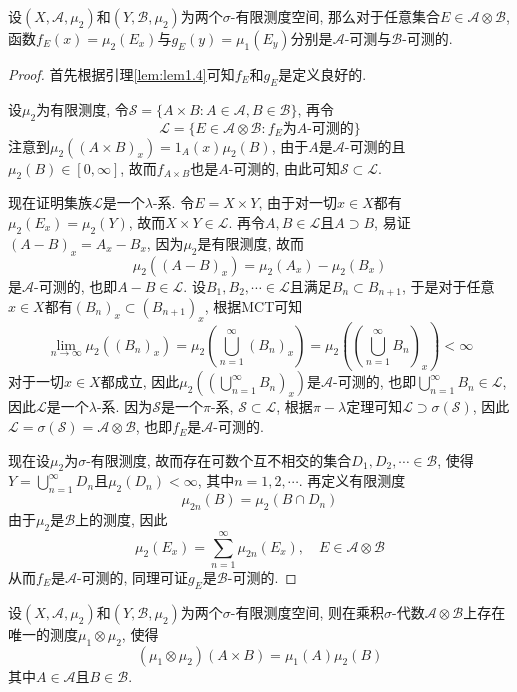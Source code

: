 \documentclass[cn, 12pt, math=mtpro2, bibstyle=apa, blue, twocol]{elegantbook}
\newcommand{\limn}{\lim_{n\to\infty}}
\newcommand{\SE}{\mathcal{S}}
\begin{document}
\begin{lemma}\label{lem:lem1.3}
设$(X,\mathcal{A},\mu_2)$和$(Y,\mathcal{B},\mu_2)$为两个$\sigma$-有限测度空间, 那么对于任意集合$E\in\mathcal{A}\otimes\mathcal{B}$, 函数$f_E(x)=\mu_2(E_x)$与$g_E(y)=\mu_1(E_y)$分别是$\mathcal{A}$-可测与$\mathcal{B}$-可测的.
\end{lemma}
\begin{proof}
  首先根据引理\ref{lem:lem1.4}可知$f_E$和$g_E$是定义良好的.

  设$\mu_2$为有限测度, 令$\SE=\{A\times B: A\in\mathcal{A}, B\in\mathcal{B}\}$, 再令
  $$\mathcal{L}=\{E\in\mathcal{A}\otimes\mathcal{B}: f_E\text{为}A\text{-可测的}\}$$
  注意到$\mu_2((A\times B)_x)=1_A(x)\mu_2(B)$, 由于$A$是$\mathcal{A}$-可测的且$\mu_2(B)\in[0,\infty]$, 故而$f_{A\times B}$也是$A$-可测的, 由此可知$\SE\subset\mathcal{L}$.

  现在证明集族$\mathcal{L}$是一个$\lambda$-系. 令$E=X\times Y$, 由于对一切$x\in X$都有$\mu_2(E_x)=\mu_2(Y)$, 故而$X\times Y\in\mathcal{L}$. 再令$A,B\in\mathcal{L}$且$A\supset B$, 易证$(A-B)_x=A_x-B_x$, 因为$\mu_2$是有限测度, 故而
  $$\mu_2((A-B)_x)=\mu_2(A_x)-\mu_2(B_x)$$
  是$\mathcal{A}$-可测的, 也即$A-B\in\mathcal{L}$. 设$B_1,B_2,\cdots\in\mathcal{L}$且满足$B_n\subset B_{n+1}$, 于是对于任意$x\in X$都有$(B_n)_x\subset (B_{n+1})_x$, 根据MCT可知
  $$\limn\mu_2((B_n)_x)=\mu_2\left(\bigcup_{n=1}^\infty (B_n)_x\right)=\mu_2\left(\left(\bigcup_{n=1}^\infty B_n\right)_x\right)<\infty$$
  对于一切$x\in X$都成立, 因此$\mu_2((\bigcup_{n=1}^\infty B_n)_x)$是$\mathcal{A}$-可测的, 也即$\bigcup_{n=1}^\infty B_n\in\mathcal{L}$, 因此$\mathcal{L}$是一个$\lambda$-系. 因为$\SE$是一个$\pi$-系, $\SE\subset \mathcal{L}$, 根据$\pi-\lambda$定理可知$\mathcal{L}\supset\sigma(\SE)$, 因此$\mathcal{L}=\sigma(\SE)=\mathcal{A}\otimes\mathcal{B}$, 也即$f_E$是$\mathcal{A}$-可测的.

  现在设$\mu_2$为$\sigma$-有限测度, 故而存在可数个互不相交的集合$D_1,D_2,\cdots\in\mathcal{B}$, 使得$Y=\bigcup_{n=1}^\infty D_n$且$\mu_2(D_n)<\infty$, 其中$n=1,2,\cdots$. 再定义有限测度
  $$\mu_{2n}(B)=\mu_2(B\cap D_n)$$
  由于$\mu_2$是$\mathcal{B}$上的测度, 因此
  $$\mu_2(E_x)=\sum_{n=1}^{\infty}\mu_{2n}(E_x),\quad E\in\mathcal{A}\otimes\mathcal{B}$$
  从而$f_E$是$\mathcal{A}$-可测的, 同理可证$g_E$是$\mathcal{B}$-可测的.
\end{proof}
\begin{theorem}\label{thm:thm1.12}
  设$(X,\mathcal{A},\mu_2)$和$(Y,\mathcal{B},\mu_2)$为两个$\sigma$-有限测度空间, 则在乘积$\sigma$-代数$\mathcal{A}\otimes\mathcal{B}$上存在唯一的测度$\mu_1\otimes\mu_2$, 使得
  \begin{equation}\label{eq1.20}
    (\mu_1\otimes\mu_2)(A\times B)=\mu_1(A)\mu_2(B)
  \end{equation}
  其中$A\in\mathcal{A}$且$B\in\mathcal{B}$.
\end{theorem}
\end{document}
